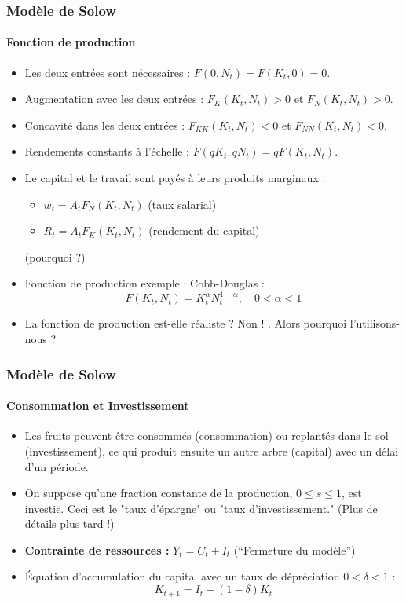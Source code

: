 \documentclass{beamer}
\begin{document}
\begin{frame}
    \frametitle{Modèle de Solow}
    \framesubtitle{Fonction de production}
    \begin{itemize}
        \item Les deux entrées sont nécessaires : \( F(0, N_t) = F(K_t, 0) = 0 \).
        \item Augmentation avec les deux entrées : \( F_K(K_t, N_t) > 0 \) et \( F_N(K_t, N_t) > 0 \).
        \item Concavité dans les deux entrées : \( F_{KK}(K_t, N_t) < 0 \) et \( F_{NN}(K_t, N_t) < 0 \).
        \item Rendements constants à l'échelle : \( F(qK_t, qN_t) = qF(K_t, N_t) \).
        \item Le capital et le travail sont payés à leurs produits marginaux :
        \begin{itemize}
            \item \( w_t = A_t F_N(K_t, N_t) \) (taux salarial)
            \item \( R_t = A_t F_K(K_t, N_t) \) (rendement du capital)
        \end{itemize}
        (pourquoi ?)\pause
        \item Fonction de production exemple : Cobb-Douglas :
        \[ F(K_t, N_t) = K_t^\alpha N_t^{1-\alpha}, \quad 0 < \alpha < 1 \]
        \item La fonction de production est-elle réaliste ? Non ! \parencite{Banerjee_2005}.
        Alors pourquoi l'utilisons-nous ?
        
    \end{itemize}
\end{frame}

\begin{frame}
    \frametitle{Modèle de Solow}
    \framesubtitle{Consommation et Investissement}
    \begin{itemize}
        \item Les fruits peuvent être consommés (consommation) ou replantés dans le sol (investissement), 
        ce qui produit ensuite un autre arbre (capital) avec un délai d'un période.
        \item On suppose qu'une fraction constante de la production, 
        \( 0 \leq s \leq 1 \), est investie. 
        Ceci est le "taux d'épargne" ou "taux d'investissement." 
        (Plus de détails plus tard !)
        \pause
        \item \textbf{Contrainte de ressources :} \( Y_t = C_t + I_t \)
        (\enquote{Fermeture du modèle})\pause
        \item Équation d'accumulation du capital avec un taux de dépréciation \( 0 < \delta < 1 \) :
        \[ K_{t+1} = I_t + (1 - \delta)K_t \]
    \end{itemize}
\end{frame}
\end{document}
